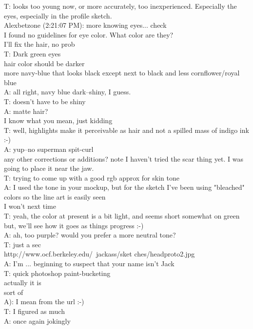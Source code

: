 T: looks too young now, or more accurately, too inexperienced. Especially the eyes, especially in the profile sketch.\\
Alexbetzone (2:21:07 PM): more knowing eyes... check\\
I found no guidelines for eye color. What color are they?\\
I'll fix the hair, no prob\\
T: Dark green eyes\\
hair color should be darker\\
more navy-blue that looks black except next to black and less cornflower/royal blue\\
A: all right, navy blue dark--shiny, I guess.\\
T: doesn't have to be shiny\\
A: matte hair?\\
I know what you mean, just kidding\\
T: well, highlights make it perceivable as hair and not a spilled mass of indigo ink\\
:-)\\
A: yup--no superman spit-curl\\
any other corrections or additions? note I haven't tried the scar thing yet. I was going to place it near the jaw.\\
T: trying to come up with a good rgb approx for skin tone\\
A: I used the tone in your mockup, but for the sketch I've been using "bleached" colors so the line art is easily seen\\
I won't next time\\
T: yeah, the color at present is a bit light, and seems short somewhat on green\\
but, we'll see how it goes as things progress :-)\\
A: ah, too purple? would you prefer a more neutral tone?\\
T: just a sec\\
http://www.ocf.berkeley.edu/~jackass/sket ches/headproto2.jpg\\
A: I'm ... beginning to suspect that your name isn't Jack\\
T: quick photoshop paint-bucketing\\
actually it is\\
sort of\\
A): I mean from the url :-)\\
T: I figured as much\\
A: once again jokingly\\
